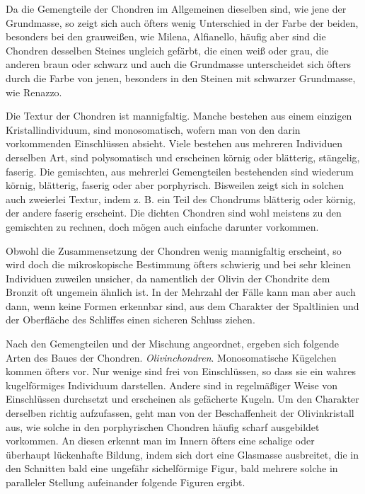 \documentclass[a4paper, 12pt, oneside]{article}
\begin{document}
Da die Gemengteile der Chondren im Allgemeinen dieselben sind, wie jene der Grundmasse, so zeigt sich auch öfters wenig Unterschied in der Farbe der beiden, besonders bei den grauweißen, wie Milena, Alfianello, häufig aber sind die Chondren desselben Steines ungleich gefärbt, die einen weiß oder grau, die anderen braun oder schwarz und auch die Grundmasse unterscheidet sich öfters durch die Farbe von jenen, besonders in den Steinen mit schwarzer Grundmasse, wie Renazzo.

Die Textur der Chondren ist mannigfaltig. Manche bestehen aus einem einzigen Kristallindividuum, sind monosomatisch, wofern man von den darin vorkommenden Einschlüssen absieht. Viele bestehen aus mehreren Individuen derselben Art, sind polysomatisch und erscheinen körnig oder blätterig, stängelig, faserig. Die gemischten, aus mehrerlei Gemengteilen bestehenden sind wiederum körnig, blätterig, faserig oder aber porphyrisch. Bisweilen zeigt sich in solchen auch zweierlei Textur, indem z. B. ein Teil des Chondrums blätterig oder körnig, der andere faserig erscheint. Die dichten Chondren sind wohl meistens zu den gemischten zu rechnen, doch mögen auch einfache darunter vorkommen.

Obwohl die Zusammensetzung der Chondren wenig mannigfaltig erscheint, so wird doch die mikroskopische Bestimmung öfters schwierig und bei sehr kleinen Individuen zuweilen unsicher, da namentlich der Olivin der Chondrite dem Bronzit oft ungemein ähnlich ist. In der Mehrzahl der Fälle kann man aber auch dann, wenn keine Formen erkennbar sind, aus dem Charakter der Spaltlinien und der Oberfläche des Schliffes einen sicheren Schluss ziehen.

Nach den Gemengteilen und der Mischung angeordnet, ergeben sich folgende Arten des Baues der Chondren. \emph{Olivinchondren}. Monosomatische Kügelchen kommen öfters vor. Nur wenige sind frei von Einschlüssen, so dass sie ein wahres kugelförmiges Individuum darstellen. Andere sind in regelmäßiger Weise von Einschlüssen durchsetzt und erscheinen als gefächerte Kugeln. Um den Charakter derselben richtig aufzufassen, geht man von der Beschaffenheit der Olivinkristall aus, wie solche in den porphyrischen Chondren häufig scharf ausgebildet vorkommen. An diesen erkennt man im Innern öfters eine schalige oder überhaupt lückenhafte Bildung, indem sich dort eine Glasmasse ausbreitet, die in den Schnitten bald eine ungefähr sichelförmige Figur, bald mehrere solche in paralleler Stellung aufeinander folgende Figuren ergibt.
\end{document}
